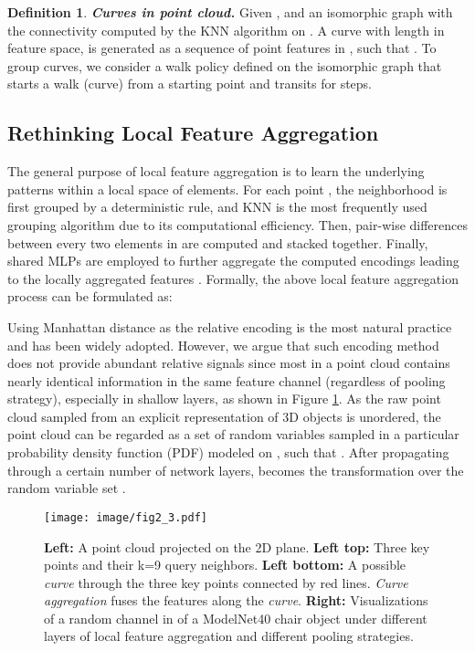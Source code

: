 \documentclass[10pt,twocolumn,letterpaper]{article}
\theoremstyle{definition}
\newtheorem{definition}{Definition}[]
\begin{document}
\begin{definition}
\textit{\textbf{Curves in point cloud.}} Given ,  and an isomorphic graph  with the connectivity  computed by the KNN algorithm on . A curve  with length  in feature space, is generated as a sequence of point features in , such that . To group curves, we consider a walk policy  defined on the isomorphic graph  that starts a walk (curve) from a starting point  and transits for  steps. 
\end{definition}






\subsection{Rethinking Local Feature Aggregation} \label{rethink}

The general purpose of local feature aggregation is to learn the underlying patterns within a local space of  elements. For each point , the neighborhood  is first grouped by a deterministic rule, and KNN is the most frequently used grouping algorithm \cite{hu2020randla,yan2020pointasnl,liu2020closer,zhang2020shape} due to its computational efficiency. Then, pair-wise differences  between every two elements in  are computed and stacked together. Finally, shared MLPs are employed to further aggregate the computed encodings leading to the locally aggregated features . Formally, the above local feature aggregation process can be formulated as:


Using Manhattan distance  as the relative encoding is the most natural practice and has been widely adopted. However, we argue that such encoding method does not provide abundant relative signals since most  in a point cloud contains nearly identical information in the same feature channel (regardless of pooling strategy), especially in shallow layers, as shown in Figure \ref{fig:2}. As the raw point cloud sampled from an explicit representation  of 3D objects is unordered, the point cloud  can be regarded as a set of random variables sampled in a particular probability density function (PDF)  modeled on , such that . 
After propagating through a certain number of network layers,  becomes the transformation over the random variable set .

\begin{figure}[t]
	\begin{center}
\texttt{[image: image/fig2\_3.pdf]}
	\end{center}
	\caption{\textbf{Left:} A point cloud projected on the 2D plane. \textbf{Left top:} Three key points and their k=9 query neighbors. \textbf{Left bottom:} A possible \textit{curve} through the three key points connected by red lines. \textit{Curve aggregation} fuses the features along the \textit{curve}. \textbf{Right:} Visualizations of a random channel in  of a ModelNet40 chair object under different layers of local feature aggregation and different pooling strategies.}
	\label{fig:2}
\end{figure}
\end{document}
